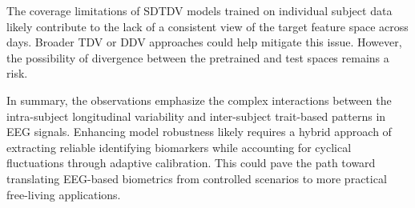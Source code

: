     The coverage limitations of SDTDV models trained on individual subject data likely contribute to the lack of a consistent view of the target feature space across days. Broader TDV or DDV approaches could help mitigate this issue. However, the possibility of divergence between the pretrained and test spaces remains a risk.
    
    In summary, the observations emphasize the complex interactions between the intra-subject longitudinal variability and inter-subject trait-based patterns in EEG signals. Enhancing model robustness likely requires a hybrid approach of extracting reliable identifying biomarkers while accounting for cyclical fluctuations through adaptive calibration. This could pave the path toward translating EEG-based biometrics from controlled scenarios to more practical free-living applications.